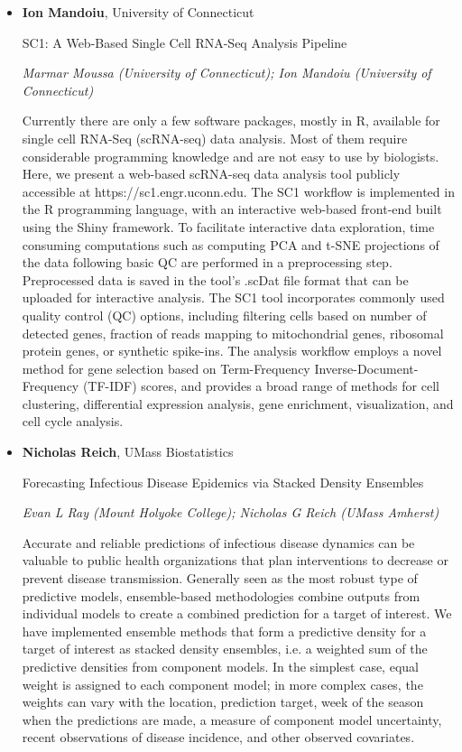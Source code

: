 \begin{itemize}
\item \textbf{Ion Mandoiu}, University of Connecticut

SC1: A Web-Based Single Cell RNA-Seq Analysis Pipeline

\emph{\footnotesize Marmar Moussa (University of Connecticut); Ion Mandoiu (University of Connecticut)}

Currently there are only a few software packages, mostly in R, available for single cell RNA-Seq (scRNA-seq) data analysis. Most of them require considerable programming knowledge and are not easy to use by biologists. Here, we present a web-based scRNA-seq data analysis tool publicly accessible at https://sc1.engr.uconn.edu. The SC1 workflow is implemented in the R programming language, with an interactive web-based front-end built using the Shiny framework. To facilitate interactive data exploration, time consuming computations such as computing PCA and t-SNE projections of the data following basic QC are performed in a preprocessing step. Preprocessed data is saved in the tool's .scDat file format that can be uploaded for interactive analysis. The SC1 tool incorporates commonly used quality control (QC) options, including filtering cells based on number of detected genes, fraction of reads mapping to mitochondrial genes, ribosomal protein genes, or synthetic spike-ins. The analysis workflow employs a novel method for gene selection based on Term-Frequency Inverse-Document-Frequency (TF-IDF) scores, and provides a broad range of methods for cell clustering, differential expression analysis, gene enrichment, visualization, and cell cycle analysis.

\item \textbf{Nicholas Reich}, UMass Biostatistics

Forecasting Infectious Disease Epidemics via Stacked Density Ensembles

\emph{\footnotesize Evan L Ray (Mount Holyoke College); Nicholas G Reich (UMass Amherst)}

Accurate and reliable predictions of infectious disease dynamics can be valuable to public health organizations that plan interventions to decrease or prevent disease transmission. Generally seen as the most robust type of predictive models, ensemble-based methodologies combine outputs from individual models to create a combined prediction for a target of interest. We have implemented ensemble methods that form a predictive density for a target of interest as stacked density ensembles, i.e. a weighted sum of the predictive densities from component models. In the simplest case, equal weight is assigned to each component model; in more complex cases, the weights can vary with the location, prediction target, week of the season when the predictions are made, a measure of component model uncertainty, recent observations of disease incidence, and other observed covariates. 


\end{itemize}
